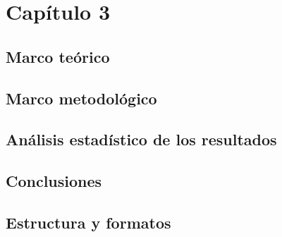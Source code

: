 \newpage

\begin{center}
\vspace*{15em}
{\huge\bfseries\color{blue}{Capítulo 3}\par}
{\huge\bfseries\color{blue}{Los Marcos y los Resultados}\par}
\end{center}
\chapter{Capítulo 3}
\section{Marco teórico}
\section{Marco metodológico}
\section{Análisis estadístico de los resultados}
\section{Conclusiones}
\section{Estructura y formatos}
